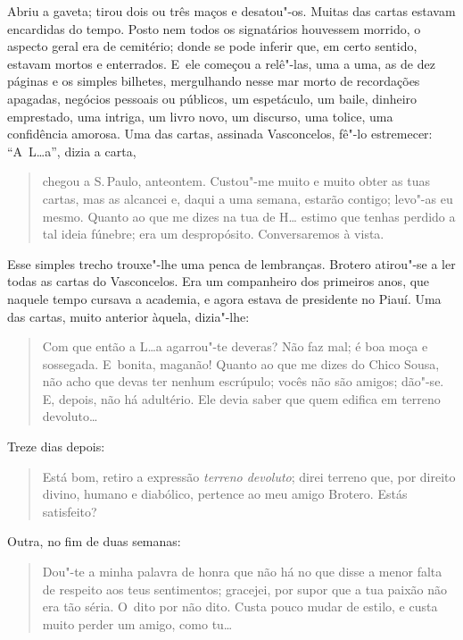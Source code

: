 \begin{linenumbers}
Abriu a gaveta; tirou dois ou três maços e desatou"-os. Muitas das cartas
estavam encardidas do tempo. Posto nem todos os signatários houvessem
morrido, o aspecto geral era de cemitério; donde se pode inferir que, em
certo sentido, estavam mortos e enterrados. E~ele começou a relê"-las,
uma a uma, as de dez páginas e os simples bilhetes, mergulhando nesse
mar morto de recordações apagadas, negócios pessoais ou públicos, um
espetáculo, um baile, dinheiro emprestado, uma intriga, um livro novo,
um discurso, uma tolice, uma confidência amorosa. Uma das cartas,
assinada Vasconcelos, fê"-lo estremecer: ``A~L\ldots{}a'', dizia a carta,

\begin{quote}
chegou a S.\,Paulo, anteontem. Custou"-me muito e muito obter as tuas
cartas, mas as alcancei e, daqui a uma semana, estarão contigo; levo"-as
eu mesmo. Quanto ao que me dizes na tua de H\ldots{} estimo que tenhas
perdido a tal ideia fúnebre; era um despropósito. Conversaremos à vista.
\end{quote}

Esse simples trecho trouxe"-lhe uma penca de lembranças. Brotero
atirou"-se a ler todas as cartas do Vasconcelos. Era um companheiro dos
primeiros anos, que naquele tempo cursava a academia, e agora estava de
presidente no Piauí. Uma das cartas, muito anterior àquela, dizia"-lhe:

\begin{quote}
Com que então a L\ldots{}a agarrou"-te deveras? Não faz mal; é boa moça e
sossegada. E~bonita, maganão! Quanto ao que me dizes do Chico Sousa, não
acho que devas ter nenhum escrúpulo; vocês não são amigos; dão"-se. E,
depois, não há adultério. Ele devia saber que quem edifica em terreno
devoluto\ldots{}
\end{quote}

Treze dias depois:

\begin{quote}
Está bom, retiro a expressão \emph{terreno devoluto}; direi terreno que,
por direito divino, humano e diabólico, pertence ao meu amigo Brotero.
Estás satisfeito?
\end{quote}

Outra, no fim de duas semanas:

\begin{quote}
Dou"-te a minha palavra de honra que não há no que disse a menor falta de
respeito aos teus sentimentos; gracejei, por supor que a tua paixão não
era tão séria. O~dito por não dito. Custa pouco mudar de estilo, e custa
muito perder um amigo, como tu\ldots{}
\end{quote}


\end{linenumbers}
